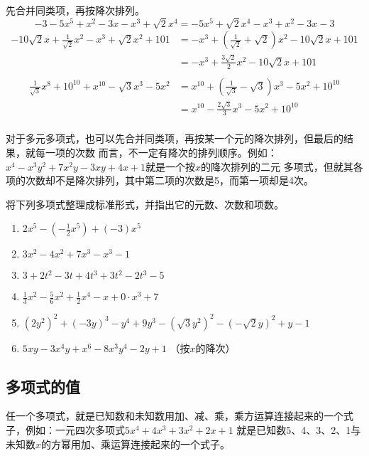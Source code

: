 \begin{solution}
    先合并同类项，再按降次排列。
\[
   -3-5x^5+x^2-3x-x^3+\sqrt{2}x^4=-5x^5+\sqrt{2}x^4-x^3+x^2-3x-3
\]
\[\begin{split}
  -10\sqrt{2}x+\frac{1}{\sqrt{2}}x^2-x^3+\sqrt{2}x^2+101
    &=-x^3+\left(\frac{1}{\sqrt{2}}+\sqrt{2}\right)x^2-10\sqrt{2}x+101\\
    &=-x^3+\frac{3\sqrt{2}}{2}x^2-10\sqrt{2}x+101\\
\end{split}\]
\[\begin{split}
  \frac{1}{\sqrt{3}}x^8+10^{10}+x^{10}-\sqrt{3}x^3-5x^2
    &=x^{10}+\left(\frac{1}{\sqrt{3}}-\sqrt{3}\right)x^3-5x^2+10^{10}\\
    &=x^{10}-\frac{2\sqrt{3}}{3}x^3-5x^2+10^{10}\\
\end{split}\]

\end{solution}

对于多元多项式，也可以先合并同类项，再按某一个元的降次排列，但最后的结果，就每一项的次数
而言，不一定有降次的排列顺序。例如：$x^4-x^3y^2+7x^2y-3xy+4x+1$就是一个按$x$的降次排列的二元
多项式，但就其各项的次数却不是降次排列，其中第二项的次数是5，而第一项却是4次。

\begin{ex}
    将下列多项式整理成标准形式，并指出它的元数、次数和项数。
    \begin{enumerate}
        \item $2x^5-\left(-\frac{1}{2}x^5\right)+(-3)x^5$
        \item $3x^2-4x^2+7x^3-x^3-1$
        \item $3+2t^2-3t+4t^3+3t^2-2t^3-5$
        \item $\frac{1}{3}x^2-\frac{5}{6}x^2+\frac{1}{2}x^4-x+0\cdot x^3+7$
        \item $(2y^2)^2+(-3y)^3-y^4+9y^3-\left(\sqrt{3}y^2\right)^2-\left(-\sqrt{2}y\right)^2+y-1$
        \item $5xy-3x^4y+x^6-8x^3y^4-2y+1$ （按$x$的降次）
    \end{enumerate}
\end{ex}

\subsection{多项式的值}
任一个多项式，就是已知数和未知数用加、减、乘，乘方运算连接起来的一个式子，例如：一元四次多项式$5x^4+4x^3+3x^2+2x+1$
就是已知数5、4、3、2、1与未知数$x$的方幂用加、乘运算连接起来的一个式子。

